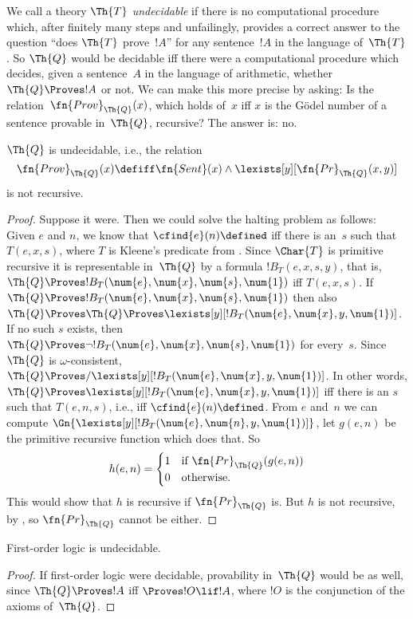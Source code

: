 \documentclass[../../include/open-logic-section]{subfiles}
\begin{document}

We call a theory $\Th{T}$ \emph{undecidable} if there is no
computational procedure which, after finitely many steps and
unfailingly, provides a correct answer to the question ``does $\Th{T}$
prove~$!A$'' for any sentence~$!A$ in the language of~$\Th{T}$.  So
$\Th{Q}$ would be decidable iff there were a computational procedure
which decides, given a sentence~$A$ in the language of arithmetic,
whether $\Th{Q} \Proves !A$ or not.  We can make this more precise by
asking: Is the relation~$\fn{Prov}_{\Th{Q}}(x)$, which holds of~$x$
iff $x$ is the G\"odel number of a sentence provable in~$\Th{Q}$,
recursive?  The answer is: no. 

\begin{thm}
$\Th{Q}$ is undecidable, i.e., the relation 
\[
\fn{Prov}_{\Th{Q}}(x) \defiff \fn{Sent}(x) \land
\lexists[y][\fn{Pr}_{\Th{Q}}(x, y)]
\]
is not recursive.
\end{thm}

\begin{proof}
Suppose it were.  Then we could solve the halting problem as follows:
Given $e$ and $n$, we know that $\cfind{e}(n) \defined$ iff there is
an~$s$ such that $T(e, x, s)$, where $T$ is Kleene's predicate from
. Since $\Char{T}$ is primitive
recursive it is representable in~$\Th{Q}$ by a formula
$!B_T(e,x,s,y)$, that is, $\Th{Q} \Proves !B_T(\num{e}, \num{x},
\num{s}, \num{1})$ iff $T(e, x, s)$.  If $\Th{Q} \Proves !B_T(\num{e},
\num{x}, \num{s}, \num{1})$ then also $\Th{Q} \Proves \Th{Q} \Proves
\lexists[y][!B_T(\num{e}, \num{x}, y, \num{1})]$. If no such $s$
exists, then $\Th{Q} \Proves \lnot !B_T(\num{e}, \num{x}, \num{s},
\num{1})$ for every~$s$. Since $\Th{Q}$ is $\omega$-consistent,
$\Th{Q} \Proves/ \lexists[y][!B_T(\num{e}, \num{x}, y, \num{1})]$.  In
other words, $\Th{Q} \Proves \lexists[y][!B_T(\num{e}, \num{x}, y,
  \num{1})]$ iff there is an $s$ such that $T(e, n, s)$, i.e., iff
$\cfind{e}(n) \defined$.  From $e$ and~$n$ we can compute
$\Gn{\lexists[y][!B_T(\num{e}, \num{n}, y, \num{1})]}$, let $g(e, n)$
  be the primitive recursive function which does that. So
\[
h(e, n) = 
\begin{cases}
1 & \text{if $\fn{Pr}_{\Th{Q}}(g(e, n))$}\\
0 & \text{otherwise}.
\end{cases}
\]
This would show that $h$ is recursive if $\fn{Pr}_{\Th{Q}}$ is. But $h$ is not
recursive, by , so $\fn{Pr}_{\Th{Q}}$
cannot be either.
\end{proof}

\begin{cor}
First-order logic is undecidable.
\end{cor}

\begin{proof}
If first-order logic were decidable, provability in~$\Th{Q}$ would be
as well, since $\Th{Q} \Proves !A$ iff $\Proves !O \lif !A$, where
$!O$ is the conjunction of the axioms of~$\Th{Q}$.
\end{proof}
\end{document}
